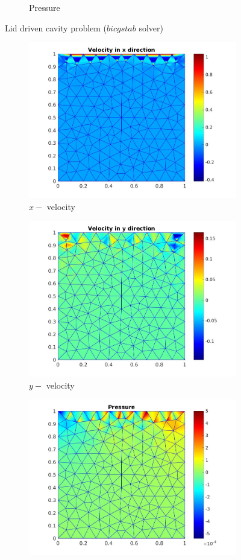 \documentclass[a4paper,openany]{book}
\begin{document}
\begin{figure}
\begin{subfigure}{\textwidth}
  \caption{Pressure} 
  \label{pressure_stoke_bicgstab_lid}
\end{subfigure}
\caption{Lid driven cavity problem ($bicgstab$ solver)}
\label{stoke_bicgstab_lid}
\end{figure}

\begin{figure}
\begin{subfigure}{\textwidth}	
  \includegraphics[width=0.8\linewidth]{lid_minres_vx.jpg}
  \caption{$x-$ velocity} 
  \label{x_vel_stoke_minres_lid}
\end{subfigure}
\begin{subfigure}{\textwidth}	
  \includegraphics[width=0.8\linewidth]{lid_minres_vy.jpg}
  \caption{$y-$ velocity} 
  \label{y_vel_stoke_minres_lid}
\end{subfigure}
\begin{subfigure}{\textwidth}	
  \includegraphics[width=0.8\linewidth]{lid_minres_pressure.jpg}

\end{subfigure}
\end{figure}
\end{document}
